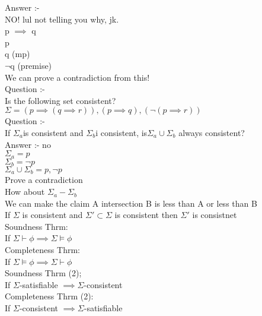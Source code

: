 \documentclass[12pt,oneside,fleqn]{article}
\theoremstyle{definition}
\begin{document}
Answer :- \\
NO! lul not telling you why, jk. \\
p $\implies$ q \\
p \\
q (mp) \\
$\neg $q (premise) \\
We can prove a contradiction from this! \\

Question :-  \\
Is the following set consistent? \\
$\Sigma = { (p \implies (q \implies r)), (p \implies q), (\neg (p \implies r)) }$ \\

Question :- \\
If $\Sigma_a $is consistent and $\Sigma_b $i consistent, is$ \Sigma_a \cup \Sigma_b$ always consistent? \\
Answer :- no \\
$\Sigma_a =  { p}$ \\
$\Sigma_b = { \neg p}$ \\
$\Sigma_a \cup \Sigma_b = { p, \neg p}$ \\ 
Prove a contradiction \\
 
How about $\Sigma_a - \Sigma_b$  \\
We can make the claim A intersection  B is less than A or less than B \\
If $\Sigma$ is consistent and $\Sigma' \subset \Sigma$ is consistent then $\Sigma'$ is consistnet \\



Soundness Thrm: \\
If $\Sigma \vdash \phi \implies \Sigma \vDash \phi$ \\
 
Completeness Thrm: \\
If $\Sigma \vDash \phi \implies \Sigma \vdash \phi$  \\

Soundness Thrm (2); \\
If $\Sigma$-satisfiable $\implies \Sigma$-consistent \\

Completeness Thrm (2): \\
If $\Sigma$-consistent $\implies \Sigma$-satisfiable \\
\end{document}

